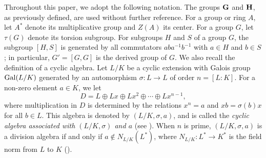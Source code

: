 \documentclass{amsart}
\theoremstyle{definition}
\numberwithin{equation}{section} %
\begin{document}
Throughout this paper, we adopt the following notation. The groups ${\bf G}$ and ${\bf H}$, as previously defined, are used without further reference. For a group or ring $A$, let $A^*$ denote its multiplicative group and $Z(A)$ its center. For a group $G$, let $\tau(G)$ denote its torsion subgroup. For subgroups $H$ and $S$ of a group $G$, the subgroup $[H,S]$ is generated by all commutators $aba^{-1}b^{-1}$ with $a \in H$ and $b \in S$; in particular, $G' = [G,G]$ is the derived group of $G$. We also recall the definition of a cyclic algebra. Let $L/K$ be a cyclic  extension with Galois group ${\rm Gal}(L/K)$ generated by an automorphism $\sigma: L \to L$ of order $n = [L:K]$. For a non-zero element $a \in K$, we let
$$
D = L \oplus Lx \oplus Lx^2 \oplus \cdots \oplus Lx^{n-1},
$$
where multiplication  in $D$ is determined by the relations $x^n = a$ and $xb = \sigma(b)x$ for all $b \in L$. This algebra is denoted by $(L/K,\sigma,a)$, and is called the \textit{cyclic algebra associated with $(L/K,\sigma)$ and $a$} (see \cite[p. 218]{lam-01}). When $n$ is prime, $(L/K, \sigma, a)$ is a division algebra if and only if $a \notin N_{L/K}(L^*)$, where $N_{L/K}: L^* \to K^*$ is the field norm from $L$ to $K$ (\cite[Corollary 14.8]{lam-01}).
\end{document}
